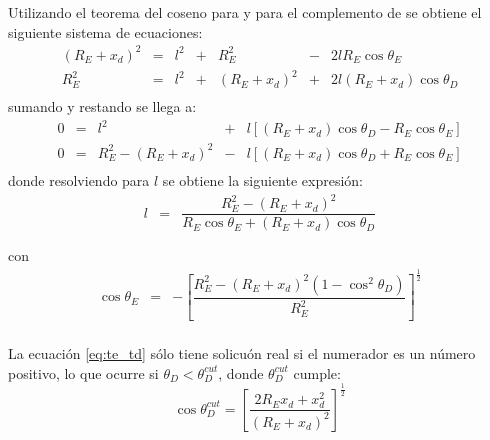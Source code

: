 	Utilizando el teorema del coseno para \te{} y para el complemento de \td{} se obtiene el siguiente sistema de ecuaciones:	
	\begin{displaymath}
		\begin{array}{rcccccl}
		(R_E+x_d)^2 & = & l^2 & + & R_E^2 & - & 2 l R_E \cos \theta_E \\
		R_E^2 & = & l^2 & + & (R_E+x_d)^2 & + & 2 l (R_E+x_d) \cos \theta_D \\
		\end{array}
	\end{displaymath}
	sumando y restando se llega a:
	\begin{displaymath}
		\begin{array}{rcccl}
		0 & = & l^2 &+ & l \left[ (R_E+x_d) \cos \theta_D - R_E \cos \theta_E \right] \\
		0 & = & R_E^2 - (R_E+x_d)^2 & - & l \left[ (R_E+x_d) \cos \theta_D + R_E \cos \theta_E \right] \\
		\end{array}
	\end{displaymath}
	donde resolviendo para $l$ se obtiene la siguiente expresi\'on:
	\begin{equation}
		\begin{array}{rcl}
		l & = & \dfrac{R_E^2-(R_E+x_d)^2}{R_E \cos \theta_E + (R_E+x_d) \cos \theta_D}\\
		&&\\
		\end{array}
		\label{eq:l_curve}
	\end{equation}
	con
	\begin{equation}
		\begin{array}{rcl}
		\cos \theta_E & = & - \left[ \dfrac{R_E^2 - (R_E+x_d)^2 (1-\cos^2 \theta_D)}{R_E^2} \right]^{\frac{1}{2}} \\ 
		\end{array}
		\label{eq:te_td}
	\end{equation}
	
	La ecuaci\'on \ref{eq:te_td} s\'olo tiene solicu\'on real si el numerador es un n\'umero positivo, lo que ocurre si $\theta_D<\theta_D^{cut}$, donde $\theta_D^{cut}$ cumple:
	\begin{equation}
	\cos \theta_D^{cut} = \left[ \frac{2 R_E x_d+x_d^2}{(R_E+x_d)^2} \right]^{\frac{1}{2}}
	\label{eq:tdc}
	\end{equation}
	
